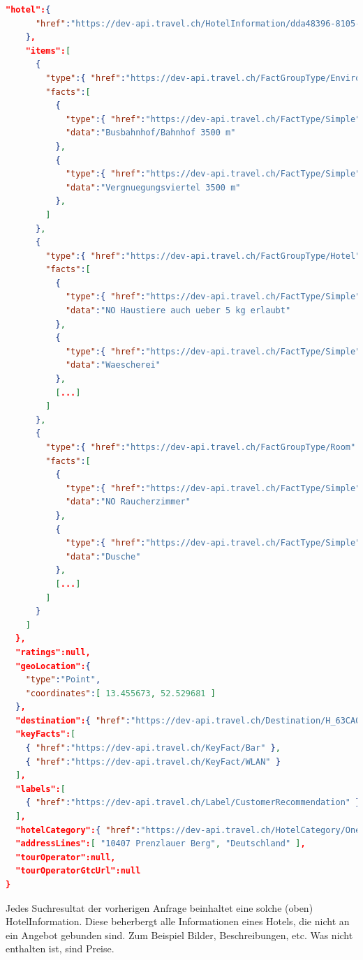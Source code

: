 \begin{lstlisting}[language=json,firstnumber=1]
    "hotel":{
      "href":"https://dev-api.travel.ch/HotelInformation/dda48396-8105-433d-b75b-668f96ec89d8"
    },
    "items":[
      {
        "type":{ "href":"https://dev-api.travel.ch/FactGroupType/Environment" },
        "facts":[
          {
            "type":{ "href":"https://dev-api.travel.ch/FactType/Simple" },
            "data":"Busbahnhof/Bahnhof 3500 m"
          },
          {
            "type":{ "href":"https://dev-api.travel.ch/FactType/Simple" },
            "data":"Vergnuegungsviertel 3500 m"
          },
        ]
      },
      {
        "type":{ "href":"https://dev-api.travel.ch/FactGroupType/Hotel" },
        "facts":[
          {
            "type":{ "href":"https://dev-api.travel.ch/FactType/Simple" },
            "data":"NO Haustiere auch ueber 5 kg erlaubt"
          },
          {
            "type":{ "href":"https://dev-api.travel.ch/FactType/Simple" },
            "data":"Waescherei"
          },
          [...]
        ]
      },
      {
        "type":{ "href":"https://dev-api.travel.ch/FactGroupType/Room" },
        "facts":[
          {
            "type":{ "href":"https://dev-api.travel.ch/FactType/Simple" },
            "data":"NO Raucherzimmer"
          },
          {
            "type":{ "href":"https://dev-api.travel.ch/FactType/Simple" },
            "data":"Dusche"
          },
          [...]
        ]
      }
    ]
  },
  "ratings":null,
  "geoLocation":{
    "type":"Point",
    "coordinates":[ 13.455673, 52.529681 ]
  },
  "destination":{ "href":"https://dev-api.travel.ch/Destination/H_63CA0931EAD8A33EF988144360A8056C" },
  "keyFacts":[
    { "href":"https://dev-api.travel.ch/KeyFact/Bar" },
    { "href":"https://dev-api.travel.ch/KeyFact/WLAN" }
  ],
  "labels":[
    { "href":"https://dev-api.travel.ch/Label/CustomerRecommendation" }
  ],
  "hotelCategory":{ "href":"https://dev-api.travel.ch/HotelCategory/One" },
  "addressLines":[ "10407 Prenzlauer Berg", "Deutschland" ],
  "tourOperator":null,
  "tourOperatorGtcUrl":null
}
\end{lstlisting}
Jedes Suchresultat der vorherigen Anfrage beinhaltet eine solche (oben) HotelInformation. Diese beherbergt alle Informationen eines Hotels, die nicht an ein Angebot gebunden sind. Zum Beispiel Bilder, Beschreibungen, etc. Was nicht enthalten ist, sind Preise.




